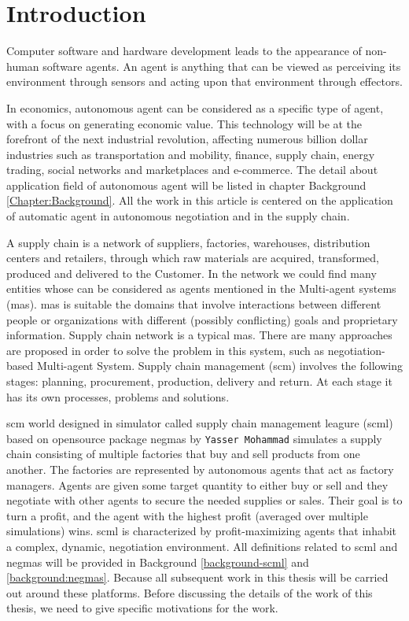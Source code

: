 \chapter{Introduction}
Computer software and hardware development leads to the appearance of non-human software agents. An agent is anything that can be viewed as perceiving its environment through sensors and acting upon that environment through effectors\parencite{RePEc:aes:infoec:v:xi:y:2007:i:4:p:115-118}.

In economics, autonomous agent can be considered as a specific type of agent, with a focus on generating economic value. This technology will be at the forefront of the next industrial revolution, affecting numerous billion dollar industries such as transportation and mobility, finance, supply chain, energy trading, social networks and marketplaces and e-commerce. The detail about application field of autonomous agent will be listed in chapter Background \ref{Chapter:Background}. All the work in this article is centered on the application of automatic agent in autonomous negotiation and in the supply chain.

A supply chain is a network of suppliers, factories, warehouses, distribution centers and retailers, through which raw materials are acquired, transformed, produced and delivered to the Customer. In the network we could find many entities whose can be considered as agents mentioned in the Multi-agent systems (\gls{mas}). \gls{mas} is suitable the domains that involve interactions between different people or organizations with different (possibly conflicting) goals and proprietary information. Supply chain network is a typical \gls{mas}. There are many approaches are proposed in order to solve the problem in this system, such as negotiation-based Multi-agent System\parencite{Chen1999ANM, DBLP:journals/corr/abs-1210-3375}. Supply chain management (\gls{scm}) involves the following stages: planning, procurement, production, delivery and return. At each stage it has its own processes, problems and solutions\parencite{Darja2011}.

\gls{scm} world designed in simulator called supply chain management leagure (\gls{scml}) based on opensource package \gls{negmas} by \texttt{Yasser Mohammad} simulates a supply chain consisting of multiple factories that buy and sell products from one another. The factories are represented by autonomous agents that act as factory managers. Agents are given some target quantity to either buy or sell and they negotiate with other agents to secure the needed supplies or sales. Their goal is to turn a profit, and the agent with the highest profit (averaged over multiple simulations) wins. \gls{scml} is characterized by profit-maximizing agents that inhabit a complex, dynamic, negotiation environment\parencite{Mohammad2019}. All definitions related to \gls{scml} and \gls{negmas} will be provided in Background \ref{background-scml} and \ref{background:negmas}. Because all subsequent work in this thesis will be carried out around these platforms. Before discussing the details of the work of this thesis, we need to give specific motivations for the work. 

